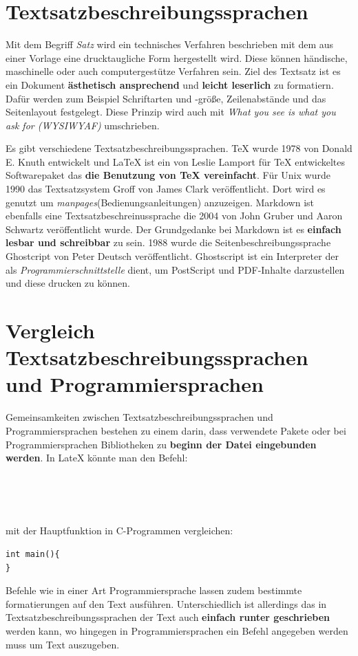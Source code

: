 \section{Textsatzbeschreibungssprachen}
Mit dem Begriff \textit{Satz} wird ein technisches Verfahren beschrieben mit dem aus einer Vorlage eine drucktaugliche Form hergestellt wird. Diese können händische, maschinelle oder auch computergestütze Verfahren sein. Ziel des Textsatz ist es ein Dokument \textbf{ästhetisch ansprechend} und \textbf{leicht leserlich} zu formatiern. Dafür werden zum Beispiel Schriftarten und -größe, Zeilenabstände und das Seitenlayout festgelegt. Diese Prinzip wird auch mit \textit{What you see is what you ask for (WYSIWYAF)} umschrieben.\par
Es gibt verschiedene Textsatzbeschreibungssprachen. TeX wurde 1978 von Donald E. Knuth entwickelt und LaTeX ist ein von Leslie Lamport für TeX entwickeltes Softwarepaket das \textbf{die Benutzung von TeX vereinfacht}. Für Unix wurde 1990 das Textsatzsystem Groff von James Clark veröffentlicht. Dort wird es genutzt um \textit{manpages}(Bedienungsanleitungen) anzuzeigen. Markdown ist ebenfalls eine Textsatzbeschreinussprache die 2004 von John Gruber und Aaron Schwartz veröffentlicht wurde. Der Grundgedanke bei Markdown ist es \textbf{einfach lesbar und schreibbar} zu sein. 1988 wurde die Seitenbeschreibungssprache Ghostcript von Peter Deutsch veröffentlicht. Ghostscript ist ein Interpreter der als \textit{Programmierschnittstelle} dient, um PostScript und PDF-Inhalte darzustellen und diese drucken zu können. 

\section{Vergleich Textsatzbeschreibungssprachen und Programmiersprachen}
Gemeinsamkeiten zwischen Textsatzbeschreibungssprachen und Programmiersprachen bestehen zu einem darin, dass verwendete Pakete oder bei Programmiersprachen Bibliotheken zu \textbf{beginn der Datei eingebunden werden}. In LateX könnte man den Befehl:
\begin{verbatim}

 


\end{verbatim}
mit der Hauptfunktion in C-Programmen vergleichen:
\begin{verbatim}
int main(){
} 
\end{verbatim}
Befehle wie in einer Art Programmiersprache lassen zudem bestimmte formatierungen auf den Text ausführen.
Unterschiedlich ist allerdings das in Textsatzbeschreibungssprachen der Text auch \textbf{einfach runter geschrieben} werden kann, wo hingegen in Programmiersprachen ein Befehl angegeben werden muss um Text auszugeben.

